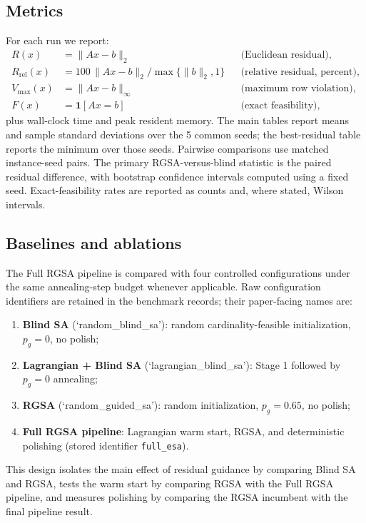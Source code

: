 \documentclass[11pt]{article}
\begin{document}
\subsection{Metrics}
For each run we report:
\begin{align}
 R(x)&=\|Ax-b\|_2 &&\text{(Euclidean residual)},\nonumber\\
 R_{\mathrm{rel}}(x)&=100\,\|Ax-b\|_2/\max\{\|b\|_2,1\} &&\text{(relative residual, percent)},\nonumber\\
 V_{\max}(x)&=\|Ax-b\|_\infty &&\text{(maximum row violation)},\nonumber\\
 F(x)&=\mathbf{1}[Ax=b] &&\text{(exact feasibility)},\label{eq:metrics}
\end{align}
plus wall-clock time and peak resident memory. The main tables report means and sample standard deviations over the 5 common seeds; the best-residual table reports the minimum over those seeds. Pairwise comparisons use matched instance-seed pairs. The primary RGSA-versus-blind statistic is the paired residual difference, with bootstrap confidence intervals computed using a fixed seed. Exact-feasibility rates are reported as counts and, where stated, Wilson intervals.

\subsection{Baselines and ablations}
The Full RGSA pipeline is compared with four controlled configurations under the same annealing-step budget whenever applicable. Raw configuration identifiers are retained in the benchmark records; their paper-facing names are:
\begin{enumerate}
  \item \textbf{Blind SA} (`random\_blind\_sa'): random cardinality-feasible initialization, $p_g=0$, no polish;
  \item \textbf{Lagrangian + Blind SA} (`lagrangian\_blind\_sa'): Stage 1 followed by $p_g=0$ annealing;
  \item \textbf{RGSA} (`random\_guided\_sa'): random initialization, $p_g=0.65$, no polish;
  \item \textbf{Full RGSA pipeline}: Lagrangian warm start, RGSA, and deterministic polishing (stored identifier \texttt{full\_esa}).
\end{enumerate}
This design isolates the main effect of residual guidance by comparing Blind SA and RGSA, tests the warm start by comparing RGSA with the Full RGSA pipeline, and measures polishing by comparing the RGSA incumbent with the final pipeline result.
\end{document}
